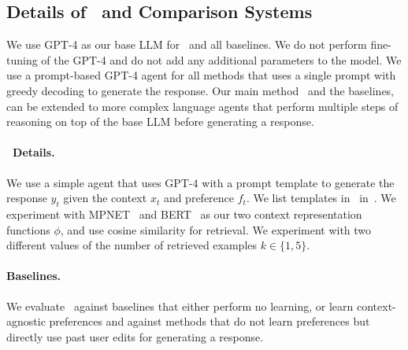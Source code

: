 \subsection{Details of \algname~and Comparison Systems}

We use GPT-4 as our base LLM for \algname~and all baselines. We do not perform fine-tuning of the GPT-4 and do not add any additional parameters to the model. We use a prompt-based GPT-4 agent for all methods that uses a single prompt with greedy decoding to generate the response. Our main method \algname~and the baselines, can be extended to more complex language agents that perform multiple steps of reasoning on top of the base LLM before generating a response.

\paragraph{\algname~Details.} We use a simple agent that uses GPT-4 with a prompt template to generate the response $y_t$ given the context $x_t$ and preference $f_t$. We list templates in~ in~. We experiment with MPNET~\citep{Song2020MPNetMA} and BERT~\citep{Devlin2019BERTPO} as our two context representation functions $\phi$, and use cosine similarity for retrieval. We experiment with two different values of the number of retrieved examples $k \in \{1, 5\}$. 



\paragraph{Baselines.} We evaluate \algname~against baselines that either perform no learning, or learn context-agnostic preferences and against methods that do not learn preferences but directly use past user edits for generating a response. 


    

